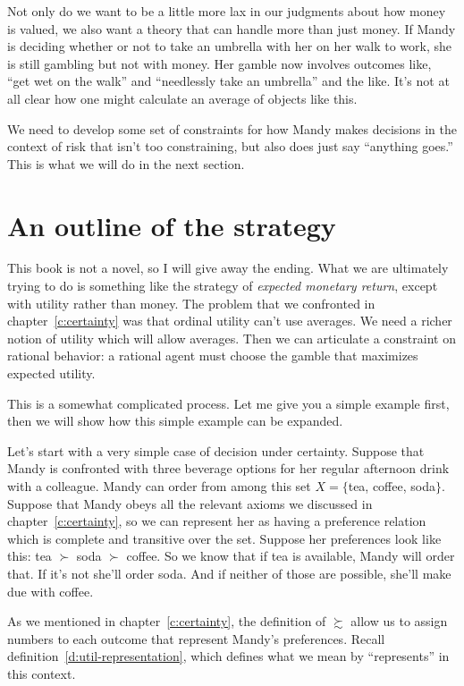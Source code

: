 Not only do we want to be a little more lax in our judgments about how money is valued, we also want a theory that can handle more than just money.  If Mandy is deciding whether or not to take an umbrella with her on her walk to work, she is still gambling but not with money.  Her gamble now involves outcomes like, ``get wet on the walk'' and ``needlessly take an umbrella'' and the like.  It's not at all clear how one might calculate an average of objects like this.

We need to develop some set of constraints for how Mandy makes decisions in the context of risk that isn't too constraining, but also does just say ``anything goes.''  This is what we will do in the next section.

\section{An outline of the strategy}
\label{s:vnm-strategy}

This book is not a novel, so I will give away the ending.  What we are ultimately trying to do is something like the strategy of {\it expected monetary return}, except with utility rather than money. The problem that we confronted in chapter~\ref{c:certainty} was that ordinal utility can't use averages.  We need a richer notion of utility which will allow averages. Then we can articulate a constraint on rational behavior: a rational agent must choose the gamble that maximizes expected utility.

This is a somewhat complicated process.  Let me give you a simple example first, then we will show how this simple example can be expanded. 

Let's start with a very simple case of decision under certainty. Suppose that Mandy is confronted with three beverage options for her regular afternoon drink with a colleague.  Mandy can order from among this set $X = \{$tea, coffee, soda$\}$.  Suppose that Mandy obeys all the relevant axioms we discussed in chapter~\ref{c:certainty}, so we can represent her as having a preference relation which is complete and transitive over the set.  Suppose her preferences look like this: tea $\succ$ soda $\succ$ coffee.  So we know that if tea is available, Mandy will order that.  If it's not she'll order soda. And if neither of those are possible, she'll make due with coffee.

As we mentioned in chapter~\ref{c:certainty}, the definition of $\succsim$ allow us to assign numbers to each outcome that represent Mandy's preferences.  Recall definition~\ref{d:util-representation}, which defines what we mean by ``represents'' in this context. 

